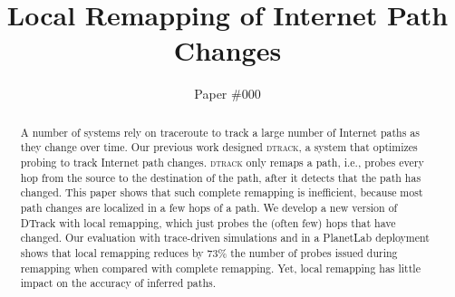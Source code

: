\documentclass[10pt, conference, letterpaper]{IEEEtran}
\title{Local Remapping of Internet Path Changes}
\author{Paper \#000\vspace{2cm}}
\newcommand{\dtrack}{\textsc{dtrack}}
\begin{document}
\maketitle


\begin{abstract}
%
A number of systems rely on traceroute to track a large number
of Internet paths as they change over time.  Our previous work designed
\dtrack{}, a system that optimizes probing to track Internet path
changes.  \dtrack{} only remaps a path, i.e., probes every hop from the
source to the destination of the path, after it detects that the path
has changed.  This paper shows that such complete remapping is
inefficient, because most path changes are localized in a few hops of a
path.  We develop a new version of DTrack with local remapping, which
just probes the (often few) hops that have changed.  Our evaluation with
trace-driven simulations and in a PlanetLab deployment shows that local
remapping reduces by 73\% the number of probes issued during remapping
when compared with complete remapping.  Yet, local remapping has little
impact on the accuracy of inferred paths.
%
\end{abstract}





















\end{document}
